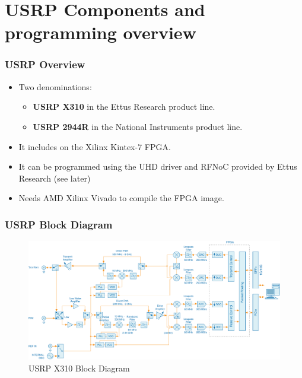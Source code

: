 \documentclass[11pt]{beamer}
\begin{document}
\section{USRP Components and programming overview}

\begin{frame}
    \frametitle{USRP Overview}
    \begin{itemize}
        \item Two denominations: 
        \begin{itemize}
            \item \textbf{USRP X310} in the Ettus Research product line.
            \item \textbf{USRP 2944R} in the National Instruments product line.
        \end{itemize}
        \item It includes on the Xilinx Kintex-7 FPGA.
        \item It can be programmed using the UHD driver and RFNoC provided by Ettus Research (see later)
        \item Needs AMD Xilinx Vivado to compile the FPGA image.
    \end{itemize}
\end{frame}

\begin{frame}
    \frametitle{USRP Block Diagram}
    \begin{figure}
        \centering
        \includegraphics[width=\textwidth]{usrp_block_diagram.pdf}
        \caption{USRP X310 Block Diagram}
    \end{figure}
\end{frame}
\end{document}
